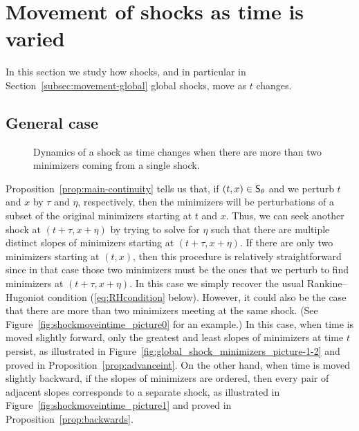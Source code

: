 \documentclass[AHL,Unicode,longabstracts]{cedram}
\newcounter{setofcase}
\newcounter{case}[setofcase]
\newcommand*\ssS{\mathsf{S}}
\let\oldin\in
\renewcommand{\in}{\mathchoice{\oldin}{\oldin}{\,\oldin\,}{\,\oldin\,}}
\begin{document}
\section{Movement of shocks as time is varied}
\label{sec:Movement-of-shocks}
In this section we study how shocks, and in particular in Section~\ref{subsec:movement-global} global shocks, move as $t$ changes.

\subsection{General case}

\begin{figure}[!htbp]
\begin{centering}
\hfill{}\hfill{}
\end{centering}
\caption{Dynamics of a shock as time changes when there are more than two minimizers coming from a single shock.}
\end{figure}

Proposition~\ref{prop:main-continuity} tells us that, if $(t,x)\in\ssS_{\theta}$ and we perturb $t$ and $x$ by $\tau$ and $\eta$, respectively, then the minimizers will be perturbations of a subset of the original minimizers starting at $t$ and $x$. Thus, we can seek another shock at $(t+\tau,x+\eta)$ by trying to solve for $\eta$ such that there are multiple distinct slopes of minimizers starting at $(t+\tau,x+\eta)$. If there are only two minimizers starting at $(t,x)$, then this procedure is relatively straightforward since in that case those two minimizers must be the ones that we perturb to find minimizers at $(t+\tau,x+\eta)$. In this case we simply recover the usual Rankine--Hugoniot condition (\eqref{eq:RHcondition} below). However, it could also be the case that there are more than two minimizers meeting at the same shock. (See Figure~\ref{fig:shockmoveintime_picture0} for an example.) In this case, when time is moved slightly forward, only the greatest and least slopes of minimizers at time $t$ persist, as illustrated in Figure~\ref{fig:global_shock_minimizers_picture-1-2} and proved in Proposition~\ref{prop:advanceint}. On the other hand, when time is moved slightly backward, if the slopes of minimizers are ordered, then every pair of adjacent slopes corresponds to a separate shock, as illustrated in Figure~\ref{fig:shockmoveintime_picture1} and proved in Proposition~\ref{prop:backwards}.
\end{document}
